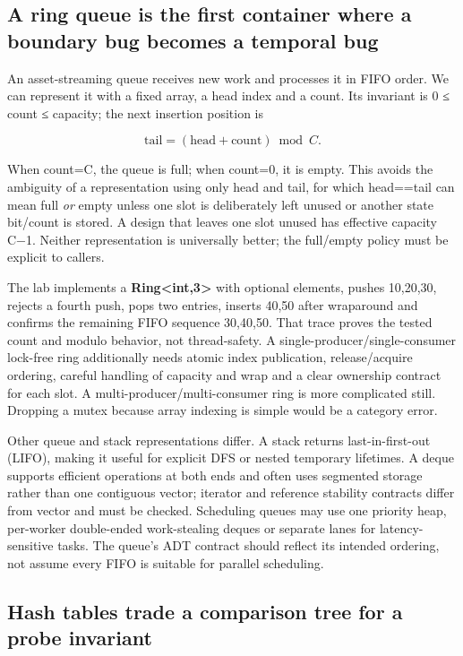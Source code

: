 \subsection{A ring queue is the first container where a boundary bug becomes a temporal bug}\label{05-engine-i-ch007-a-ring-queue-is-the-first-container-where-a-boundary-bug-becomes-a-temporal-bug}

An asset-streaming queue receives new work and processes it in FIFO order. We can represent it with a fixed array, a head index and a count. Its invariant is 0 ≤ count ≤ capacity; the next insertion position is

\[
\mathrm{tail}=(\mathrm{head}+\mathrm{count})\bmod C.
\]

When count=C, the queue is full; when count=0, it is empty. This avoids the ambiguity of a representation using only head and tail, for which head==tail can mean full \emph{or} empty unless one slot is deliberately left unused or another state bit/count is stored. A design that leaves one slot unused has effective capacity C−1. Neither representation is universally better; the full/empty policy must be explicit to callers.

The lab implements a \textbf{Ring\textless int,3\textgreater{}} with optional elements, pushes 10,20,30, rejects a fourth push, pops two entries, inserts 40,50 after wraparound and confirms the remaining FIFO sequence 30,40,50. That trace proves the tested count and modulo behavior, not thread-safety. A single-producer/single-consumer lock-free ring additionally needs atomic index publication, release/acquire ordering, careful handling of capacity and wrap and a clear ownership contract for each slot. A multi-producer/multi-consumer ring is more complicated still. Dropping a mutex because array indexing is simple would be a category error.

Other queue and stack representations differ. A stack returns last-in-first-out (LIFO), making it useful for explicit DFS or nested temporary lifetimes. A deque supports efficient operations at both ends and often uses segmented storage rather than one contiguous vector; iterator and reference stability contracts differ from vector and must be checked. Scheduling queues may use one priority heap, per-worker double-ended work-stealing deques or separate lanes for latency-sensitive tasks. The queue's ADT contract should reflect its intended ordering, not assume every FIFO is suitable for parallel scheduling.

\subsection{Hash tables trade a comparison tree for a probe invariant}\label{05-engine-i-ch007-hash-tables-trade-a-comparison-tree-for-a-probe-invariant}

